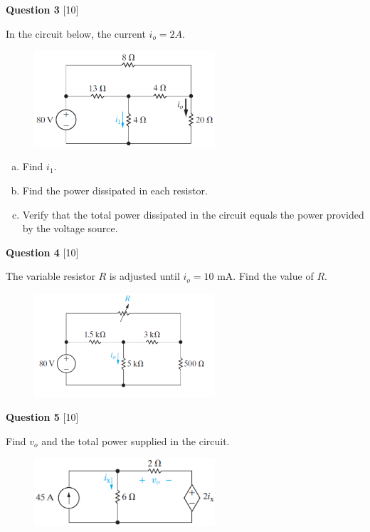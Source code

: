 \documentclass[12pt]{article}
\begin{document}
\newpage
{\bf Question 3} [10] %

In the circuit below, the current $i_{o} = 2A$.  
\begin{figure}[h!]
     \centering
\vspace{-0.1in}
     \includegraphics[clip,width=0.6\textwidth]{Fig2-22.png}
\vspace{-0.15in}
\end{figure}

\begin{enumerate}[(a)]
\item Find $i_1$.
\item Find the power dissipated in each resistor.
\item Verify that the total power dissipated in the circuit equals the power provided by the voltage source.
\end{enumerate}

{\bf Question 4} [10] %

The variable resistor $R$ is adjusted until $i_{o} = 10$ mA. Find the value of $R$.
\begin{figure}[!h]
  \centering 
  \includegraphics[clip,width=0.6\textwidth]{Fig2-27.png}
\end{figure}

{\bf Question 5} [10] %

Find $v_{o}$ and the total power supplied in the circuit.
\begin{figure}[h!]
\centering 
\includegraphics[clip,width=0.6\textwidth]{Fig2-34.png}
\end{figure}
\end{document}
